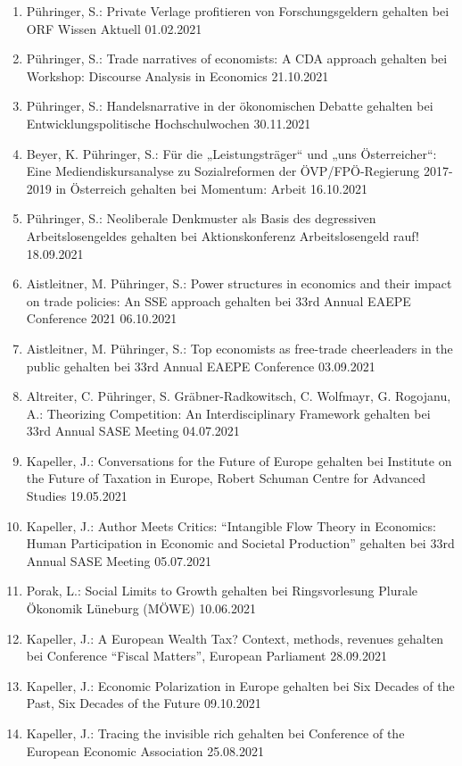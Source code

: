 \begin{enumerate}
	\item Pühringer, S.: Private Verlage profitieren von Forschungsgeldern gehalten bei ORF Wissen Aktuell 01.02.2021
	\item Pühringer, S.: Trade narratives of economists: A CDA approach gehalten bei Workshop: Discourse Analysis in Economics 21.10.2021
	\item Pühringer, S.: Handelsnarrative in der ökonomischen Debatte gehalten bei Entwicklungspolitische Hochschulwochen 30.11.2021
	\item Beyer, K. Pühringer, S.: \glqq Für die „Leistungsträger“ und „uns Österreicher“: Eine Mediendiskursanalyse zu Sozialreformen der ÖVP/FPÖ-Regierung 2017-2019 in Österreich\grqq{} gehalten bei Momentum: Arbeit 16.10.2021
	\item Pühringer, S.: Neoliberale Denkmuster als Basis des degressiven Arbeitslosengeldes gehalten bei Aktionskonferenz \glqq Arbeitslosengeld rauf!\grqq{} 18.09.2021
	\item Aistleitner, M. Pühringer, S.: Power structures in economics and their impact on trade policies: An SSE approach gehalten bei 33rd Annual EAEPE Conference 2021 06.10.2021
	\item Aistleitner, M. Pühringer, S.: Top economists as free-trade cheerleaders in the public gehalten bei 33rd Annual EAEPE Conference 03.09.2021
	\item Altreiter, C. Pühringer, S. Gräbner-Radkowitsch, C. Wolfmayr, G. Rogojanu, A.: Theorizing Competition: An Interdisciplinary Framework gehalten bei 33rd Annual SASE Meeting 04.07.2021
	\item Kapeller, J.: Conversations for the Future of Europe gehalten bei Institute on the Future of Taxation in Europe, Robert Schuman Centre for Advanced Studies 19.05.2021
	\item Kapeller, J.: Author Meets Critics: “Intangible Flow Theory in Economics: Human Participation in Economic and Societal Production” gehalten bei 33rd Annual SASE Meeting 05.07.2021
	\item Porak, L.: Social Limits to Growth gehalten bei Ringsvorlesung Plurale Ökonomik Lüneburg (MÖWE) 10.06.2021
	\item Kapeller, J.: A European Wealth Tax? Context, methods, revenues gehalten bei Conference “Fiscal Matters”, European Parliament 28.09.2021
	\item Kapeller, J.: Economic Polarization in Europe gehalten bei Six Decades of the Past, Six Decades of the Future 09.10.2021
	\item Kapeller, J.: Tracing the invisible rich gehalten bei Conference of the European Economic Association 25.08.2021

\end{enumerate}

